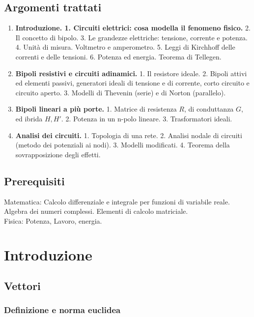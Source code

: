 \documentclass[12pt, a4paper]{article}
\begin{document}
\subsection{Argomenti trattati}
\begin{enumerate}
    \item \textbf{Introduzione. 1. Circuiti elettrici: cosa modella il fenomeno fisico.} 2. Il concetto di bipolo. 3. Le grandezze elettriche: tensione, corrente e potenza. 4. Unità di misura. Voltmetro e amperometro. 5. Leggi di Kirchhoff delle correnti e delle tensioni. 6. Potenza ed energia. Teorema di Tellegen.
    
    \item \textbf{Bipoli resistivi e circuiti adinamici.} 1. Il resistore ideale. 2. Bipoli attivi ed elementi passivi, generatori ideali di tensione e di corrente, corto circuito e circuito aperto. 3. Modelli di Thevenin (serie) e di Norton (parallelo). 
    
    \item \textbf{Bipoli lineari a più porte.} 1. Matrice di resistenza $R$, di conduttanza $G$, ed ibrida $H, H'$. 2. Potenza in un n-polo lineare. 3. Trasformatori ideali.
    
    \item \textbf{Analisi dei circuiti.} 1. Topologia di una rete. 2. Analisi nodale di circuiti (metodo dei potenziali ai nodi). 3. Modelli modificati. 4. Teorema della sovrapposizione degli effetti.
\end{enumerate}

\subsection{Prerequisiti}
Matematica: Calcolo differenziale e integrale per funzioni di variabile reale. Algebra dei numeri complessi. Elementi di calcolo matriciale.\\
Fisica: Potenza, Lavoro, energia.

\newpage

\section{Introduzione}
\subsection{Vettori}
\subsubsection{Definizione e norma euclidea}
\end{document}
